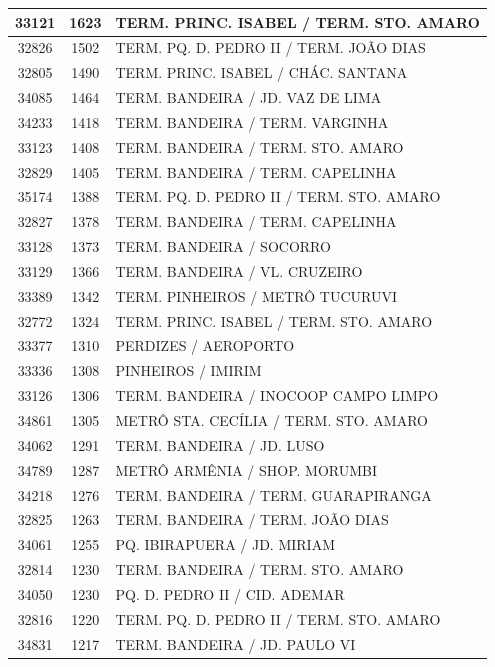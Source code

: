 \documentclass[
	12pt,				%
	oneside,			%
	a4paper,			%
	english,			%
	brazil				%
	]{abntex2ppgsi}
\begin{document}
{{{\begin{apendicesenv}
\begin{longtable}{c|c|p{7cm}}
33121 &	1623 &	TERM. PRINC. ISABEL / TERM. STO. AMARO \\ 
 \hline 
32826 &	1502 &	TERM. PQ. D. PEDRO II / TERM. JOÃO DIAS \\ 
 \hline 
32805 &	1490 &	TERM. PRINC. ISABEL / CHÁC. SANTANA \\ 
 \hline 
34085 &	1464 &	TERM. BANDEIRA / JD. VAZ DE LIMA \\ 
 \hline 
34233 &	1418 &	TERM. BANDEIRA / TERM. VARGINHA \\ 
 \hline 
33123 &	1408 &	TERM. BANDEIRA / TERM. STO. AMARO \\ 
 \hline 
32829 &	1405 &	TERM. BANDEIRA / TERM. CAPELINHA \\ 
 \hline 
35174 &	1388 &	TERM. PQ. D. PEDRO II / TERM. STO. AMARO \\ 
 \hline 
32827 &	1378 &	TERM. BANDEIRA / TERM. CAPELINHA \\ 
 \hline 
33128 &	1373 &	TERM. BANDEIRA / SOCORRO \\ 
 \hline 
33129 &	1366 &	TERM. BANDEIRA / VL. CRUZEIRO \\ 
 \hline 
33389 &	1342 &	TERM. PINHEIROS / METRÔ TUCURUVI \\ 
 \hline 
32772 &	1324 &	TERM. PRINC. ISABEL / TERM. STO. AMARO \\ 
 \hline 
33377 &	1310 &	PERDIZES / AEROPORTO \\ 
 \hline 
33336 &	1308 &	PINHEIROS / IMIRIM \\ 
 \hline 
33126 &	1306 &	TERM. BANDEIRA / INOCOOP CAMPO LIMPO \\ 
 \hline 
34861 &	1305 &	METRÔ STA. CECÍLIA / TERM. STO. AMARO \\ 
 \hline 
34062 &	1291 &	TERM. BANDEIRA / JD. LUSO \\ 
 \hline 
34789 &	1287 &	METRÔ ARMÊNIA / SHOP. MORUMBI \\ 
 \hline 
34218 &	1276 &	TERM. BANDEIRA / TERM. GUARAPIRANGA \\ 
 \hline 
32825 &	1263 &	TERM. BANDEIRA / TERM. JOÃO DIAS \\ 
 \hline 
34061 &	1255 &	PQ. IBIRAPUERA / JD. MIRIAM \\ 
 \hline 
32814 &	1230 &	TERM. BANDEIRA / TERM. STO. AMARO \\ 
 \hline 
34050 &	1230 &	PQ. D. PEDRO II / CID. ADEMAR \\ 
 \hline 
32816 &	1220 &	TERM. PQ. D. PEDRO II / TERM. STO. AMARO \\ 
 \hline 
34831 &	1217 &	TERM. BANDEIRA / JD. PAULO VI \\ 

\end{longtable}
\end{apendicesenv}}}}
\end{document}
